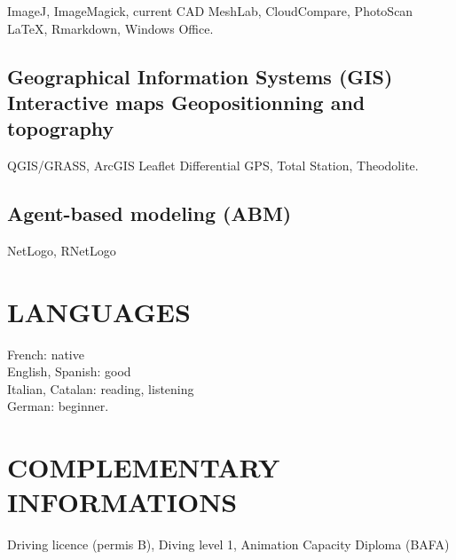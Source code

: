 \documentclass[11pt]{report} %
\begin{document}
ImageJ, ImageMagick, current CAD \textbf{{\textbar}} MeshLab, CloudCompare, PhotoScan \textbf{{\textbar}} \LaTeX, Rmarkdown, Windows Office.\textbf{}

\subsection*{Geographical Information Systems (GIS) {\textbar} Interactive maps {\textbar} Geopositionning and topography}

QGIS/GRASS, ArcGIS {\textbar} Leaflet {\textbar} Differential GPS, Total Station, Theodolite.

\subsection*{Agent-based modeling (ABM)}

NetLogo, RNetLogo

\section*{LANGUAGES}

French: native \\
English, Spanish: good \\
Italian, Catalan: reading, listening \\
German: beginner.

\section*{COMPLEMENTARY INFORMATIONS}

Driving licence (permis B), Diving level 1, Animation Capacity Diploma (BAFA)
\end{document}
